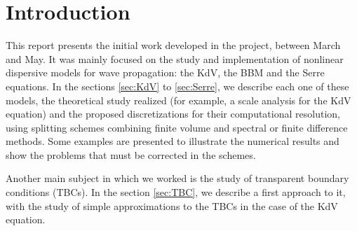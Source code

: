 \section{Introduction}

\indent This report presents the initial work developed in the project, between March and May. It was mainly focused on the study and implementation of nonlinear dispersive models for wave propagation: the KdV, the BBM and the Serre equations. In the sections \ref{sec:KdV} to \ref{sec:Serre}, we describe each one of these models, the theoretical study realized (for example, a scale analysis for the KdV equation) and the proposed discretizations for their computational resolution, using splitting schemes combining finite volume and spectral or finite difference methods. Some examples are presented to illustrate the numerical results and show the problems that must be corrected in the schemes.

\indent Another main subject in which we worked is the study of transparent boundary conditions (TBCs). In the section \ref{sec:TBC}, we describe a first approach to it, with the study of simple approximations to the TBCs in the case of the KdV equation.